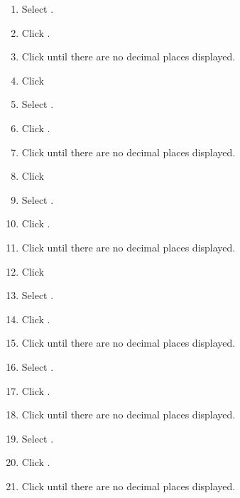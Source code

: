 \begin{enumbox}
\begin{enumerate}
		\item Select .
		\item Click .
		\item Click  until there are no decimal places displayed.
		\item Click  
	
		\item Select .
		\item Click .
		\item Click  until there are no decimal places displayed.
		\item Click  
	
		\item Select .
		\item Click .
		\item Click  until there are no decimal places displayed.
		\item Click  
	
		\item Select .
		\item Click .
		\item Click  until there are no decimal places displayed.
	
		\item Select .
		\item Click .
		\item Click  until there are no decimal places displayed.
	
		\item Select .
		\item Click .
		\item Click  until there are no decimal places displayed.
	

\end{enumerate}
\end{enumbox}
